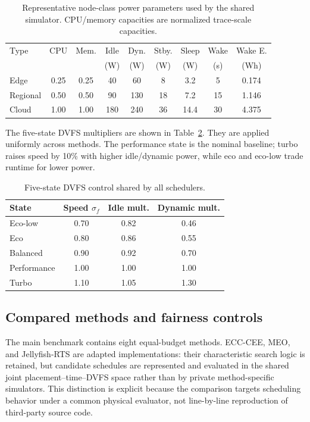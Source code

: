 \documentclass[preprint,12pt]{elsarticle}
\begin{document}
\begin{table}[t]
\centering
\caption{Representative node-class power parameters used by the shared simulator. CPU/memory capacities are normalized trace-scale capacities.}
\label{tab:power-model}
\scriptsize
\setlength{\tabcolsep}{4pt}
\begin{tabular}{lcccccccc}
\toprule
Type & CPU & Mem. & Idle & Dyn. & Stby. & Sleep & Wake & Wake E. \\
 & & & (W) & (W) & (W) & (W) & (s) & (Wh) \\
\midrule
Edge & 0.25 & 0.25 & 40 & 60 & 8 & 3.2 & 5 & 0.174 \\
Regional & 0.50 & 0.50 & 90 & 130 & 18 & 7.2 & 15 & 1.146 \\
Cloud & 1.00 & 1.00 & 180 & 240 & 36 & 14.4 & 30 & 4.375 \\
\bottomrule
\end{tabular}
\end{table}

The five-state DVFS multipliers are shown in Table~\ref{tab:dvfs}. They are applied uniformly across methods. The performance state is the nominal baseline; turbo raises speed by 10\% with higher idle/dynamic power, while eco and eco-low trade runtime for lower power.

\begin{table}[t]
\centering
\caption{Five-state DVFS control shared by all schedulers.}
\label{tab:dvfs}
\small
\begin{tabular}{lccc}
\toprule
State & Speed $\sigma_f$ & Idle mult. & Dynamic mult. \\
\midrule
Eco-low & 0.70 & 0.82 & 0.46 \\
Eco & 0.80 & 0.86 & 0.55 \\
Balanced & 0.90 & 0.92 & 0.70 \\
Performance & 1.00 & 1.00 & 1.00 \\
Turbo & 1.10 & 1.05 & 1.30 \\
\bottomrule
\end{tabular}
\end{table}

\subsection{Compared methods and fairness controls}

The main benchmark contains eight equal-budget methods. ECC-CEE, MEO, and Jellyfish-RTS are adapted implementations: their characteristic search logic is retained, but candidate schedules are represented and evaluated in the shared joint placement--time--DVFS space rather than by private method-specific simulators. This distinction is explicit because the comparison targets scheduling behavior under a common physical evaluator, not line-by-line reproduction of third-party source code.
\end{document}
